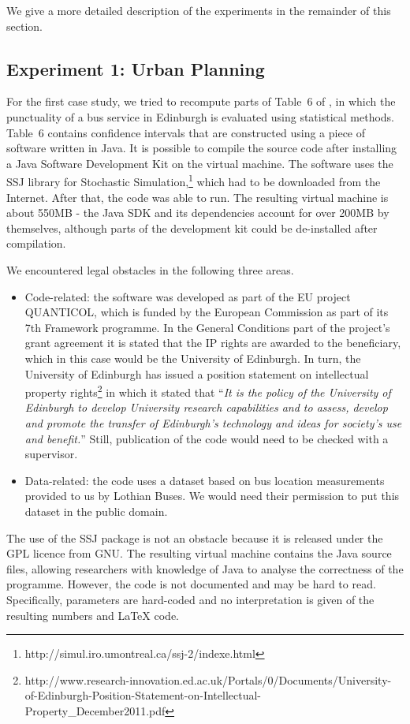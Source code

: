 We give a more detailed description of the experiments in the remainder of this section.

\subsection*{Experiment 1: Urban Planning}

For the first case study, we tried to recompute parts of Table~6 of \cite{danielpaper}, in which the punctuality of a bus service in Edinburgh is evaluated using statistical methods. Table~6 contains confidence intervals that are constructed using a piece of software written in Java. It is possible to compile the source code after installing a Java Software Development Kit on the virtual machine. The software uses the SSJ library for Stochastic Simulation,\footnote{http://simul.iro.umontreal.ca/ssj-2/indexe.html} which had to be downloaded from the Internet. After that, the code was able to run.
The resulting virtual machine is about 550MB - the Java SDK and its dependencies account for over 200MB by themselves, although parts of the development kit could be de-installed after compilation.

We encountered legal obstacles in the following three areas.
\begin{itemize} 
\item Code-related: the software was developed as part of the EU project QUANTICOL, which is funded by the European Commission as part of its 7th Framework programme. In the General Conditions part of the project's grant agreement it is stated that the IP rights are awarded to the beneficiary, which in this case would be the University of Edinburgh. In turn, the University of Edinburgh has issued a position statement on intellectual property rights\footnote{http://www.research-innovation.ed.ac.uk/Portals/0/Documents/University-of-Edinburgh-Position-Statement-on-Intellectual-Property\_December2011.pdf} in which it stated that ``\emph{It is the policy of the University of Edinburgh to develop University research capabilities and to assess, develop and promote the transfer of Edinburgh's technology and ideas for society's use and benefit.}'' Still, publication of the code would need to be checked with a supervisor.
\item Data-related: the code uses a dataset based on bus location measurements provided to us by Lothian Buses. We would need their permission to put this dataset in the public domain.
\end{itemize}
The use of the SSJ package is not an obstacle because it is released under the GPL licence from GNU.
The resulting virtual machine contains the Java source files, allowing researchers with knowledge of Java to analyse the correctness of the programme. However, the code is not documented and may be hard to read. Specifically, parameters are hard-coded and no interpretation is given of the resulting numbers and LaTeX code.

